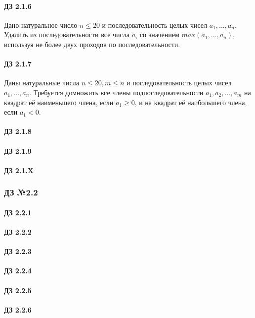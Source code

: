 \documentclass[12pt,a4paper]{report}
\begin{document}
\paragraph*{ДЗ 2.1.6} Дано натуральное число $n \le 20$ и последовательность целых чисел $a_1, ..., a_n$. Удалить из последовательности все числа $a_i$ со значением $max(a_1, ..., a_n)$, используя не более двух проходов по последовательности.
\paragraph*{ДЗ 2.1.7} Даны натуральные числа $n \le 20, m \le n$ и последовательность целых чисел $a_1, ..., a_n$. Требуется домножить все члены подпоследовательности $a_1, a_2, ..., a_{m}$ на квадрат её наименьшего члена, если $a_1 \ge 0$, и на квадрат её наибольшего члена, если $a_1 < 0$.
\paragraph*{ДЗ 2.1.8}
\paragraph*{ДЗ 2.1.9}
\paragraph*{ДЗ 2.1.X}

\clearpage
\subsubsection*{ДЗ №2.2}
\paragraph*{ДЗ 2.2.1}
\paragraph*{ДЗ 2.2.2}
\paragraph*{ДЗ 2.2.3}
\paragraph*{ДЗ 2.2.4}
\paragraph*{ДЗ 2.2.5}
\paragraph*{ДЗ 2.2.6}
\end{document}
